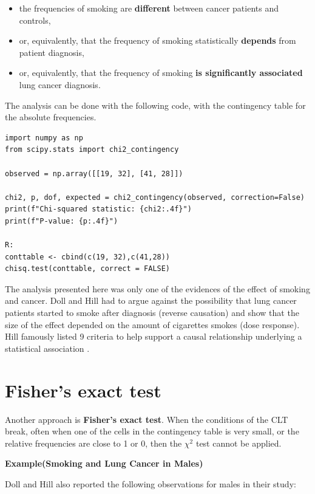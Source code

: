 \documentclass[
]{book}
\begin{document}
\begin{itemize}
\item
  the frequencies of smoking are \textbf{different} between cancer patients and controls,
\item
  or, equivalently, that the frequency of smoking statistically \textbf{depends} from patient diagnosis,
\item
  or, equivalently, that the frequency of smoking \textbf{is significantly associated} lung cancer diagnosis.
\end{itemize}

The analysis can be done with the following code, with the contingency table for the absolute frequencies.

\begin{verbatim}
import numpy as np
from scipy.stats import chi2_contingency

observed = np.array([[19, 32], [41, 28]])

chi2, p, dof, expected = chi2_contingency(observed, correction=False)
print(f"Chi-squared statistic: {chi2:.4f}")
print(f"P-value: {p:.4f}")

R:
conttable <- cbind(c(19, 32),c(41,28))
chisq.test(conttable, correct = FALSE)
\end{verbatim}

The analysis presented here was only one of the evidences of the effect of smoking and cancer. Doll and Hill had to argue against the possibility that lung cancer patients started to smoke after diagnosis (reverse causation) and show that the size of the effect depended on the amount of cigarettes smokes (dose response). Hill famously listed 9 criteria to help support a causal relationship underlying a statistical association \citep{hill1965environment}.

\hypertarget{fishers-exact-test}{%
\section{Fisher's exact test}\label{fishers-exact-test}}

Another approach is \textbf{Fisher's exact test}. When the conditions of the CLT break, often when one of the cells in the contingency table is very small, or the relative frequencies are close to 1 or 0, then the \(\chi^2\) test cannot be applied.

\textbf{Example(Smoking and Lung Cancer in Males)}

Doll and Hill also reported the following observations for males in their study:
\end{document}
